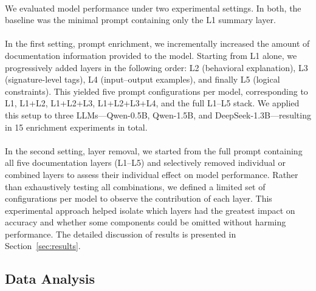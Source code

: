\documentclass[a4paper]{usiinfbachelorproject}
\begin{document}
\\[2pt]
We evaluated model performance under two experimental settings. In both, the baseline was the minimal prompt containing only the L1 summary layer.\\
\\[2pt]
In the first setting, prompt enrichment, we incrementally increased the amount of documentation information provided to the model. Starting from L1 alone, we progressively added layers in the following order: L2 (behavioral explanation), L3 (signature-level tags), L4 (input–output examples), and finally L5 (logical constraints). This yielded five prompt configurations per model, corresponding to L1, L1+L2, L1+L2+L3, L1+L2+L3+L4, and the full L1–L5 stack. We applied this setup to three LLMs—Qwen-0.5B, Qwen-1.5B, and DeepSeek-1.3B—resulting in 15 enrichment experiments in total.\\
\\[2pt]
In the second setting, layer removal, we started from the full prompt containing all five documentation layers (L1–L5) and selectively removed individual or combined layers to assess their individual effect on model performance. Rather than exhaustively testing all combinations, we defined a limited set of configurations per model to observe the contribution of each layer. This experimental approach helped isolate which layers had the greatest impact on accuracy and whether some components could be omitted without harming performance. The detailed discussion of results is presented in Section~\ref{sec:results}.

\subsection{Data Analysis}\label{sec:analysis}
\end{document}
